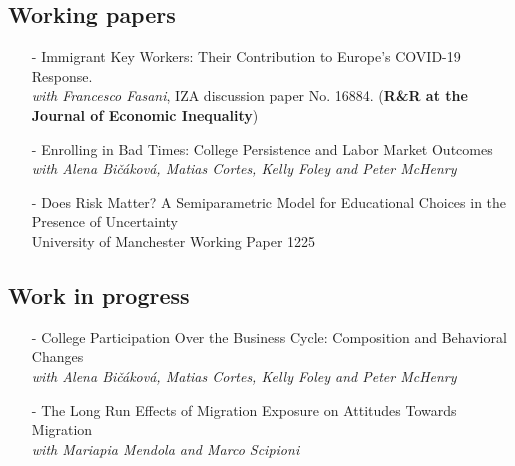 \documentclass[11pt]{article}
\begin{document}
\nocite{mazza_vophem_ee}
\nocite{bcm_le}
\nocite{fasani_mazza-ilrr}
\nocite{christl_et_al-fs}
\nocite{mazza_scipioni_jepp}
\nocite{bicakova_cortes_mazza_ej}
\nocite{mazza_vohpem_hartog_le}
\nocite{mazza_vophem_jrssa}

\hspace*{20pt}%
\begin{minipage}[t]{0.9\textwidth}%
\vspace{-.9cm}
    \centering
    \renewcommand\refname{}
        
        
\end{minipage}

\vspace{-.3cm}

\subsection*{\sc Working papers}

\begin{itemize}[itemsep=0pt, leftmargin=20pt]
\item[-]{Immigrant Key Workers: Their Contribution to Europe's COVID-19 Response.} \\
    \emph{with Francesco Fasani}, IZA discussion paper No. 16884. (\textbf{R\&R at the Journal of Economic Inequality})
\item[-]{Enrolling in Bad Times: College Persistence and Labor Market Outcomes}\\
	\emph{with Alena Bi\v{c}\'{a}kov\'{a}, Matias Cortes, Kelly Foley and Peter McHenry} 
\item [-]Does Risk Matter? A Semiparametric Model for Educational Choices in the Presence of Uncertainty \\
University of Manchester Working Paper 1225

\end{itemize}

\subsection*{\sc Work in progress}

\begin{itemize}[itemsep=0pt, leftmargin=20pt]
\item [-]College Participation Over the Business Cycle: Composition and Behavioral Changes\\
\emph{with Alena Bi\v{c}\'{a}kov\'{a}, Matias Cortes, Kelly Foley and Peter McHenry}
\item [-]{The Long Run Effects of Migration Exposure on Attitudes Towards Migration}\\
\emph{with Mariapia Mendola and Marco Scipioni}
\end{itemize}
\end{document}
